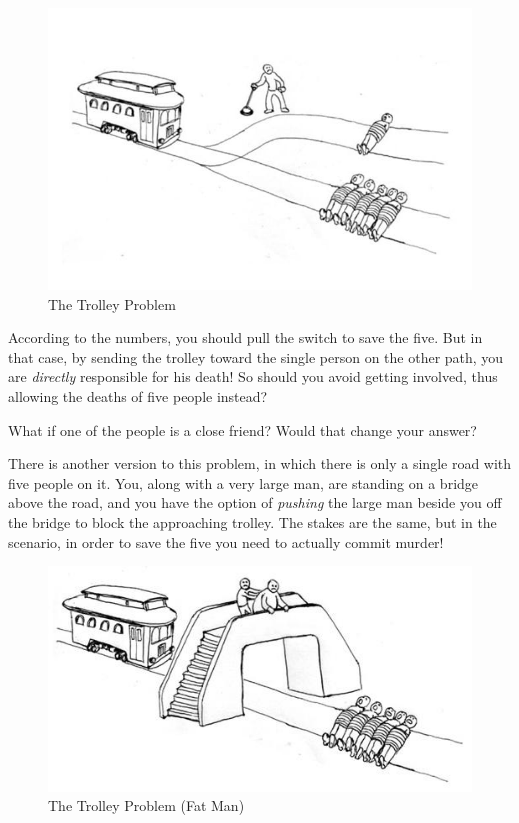 \begin{figure}[!ht]
    \centering
    \includegraphics[width=\textwidth]{images/The_Trolley_Problem.jpg}
    \caption{The Trolley Problem} \label{fig:trolley_problem}
\end{figure}

According to the numbers, you should pull the switch to save the five. But in
that case, by sending the trolley toward the single person on the other path,
you are \textit{directly} responsible for his death! So should you avoid getting
involved, thus allowing the deaths of five people instead?

What if one of the people is a close friend? Would that change your answer?

There is another version to this problem, in which there is only a single road
with five people on it. You, along with a very large man, are standing on a
bridge above the road, and you have the option of \textit{pushing} the large man
beside you off the bridge to block the approaching trolley. The stakes are the
same, but in the scenario, in order to save the five you need to actually commit
murder!

\begin{figure}[!ht]
    \centering
    \includegraphics[width=\textwidth]{images/The_Trolley_Problem_Fat_Man.jpg}
    \caption{The Trolley Problem (Fat Man)}
    \label{fig:trolley_problem_fat_man}
\end{figure}

